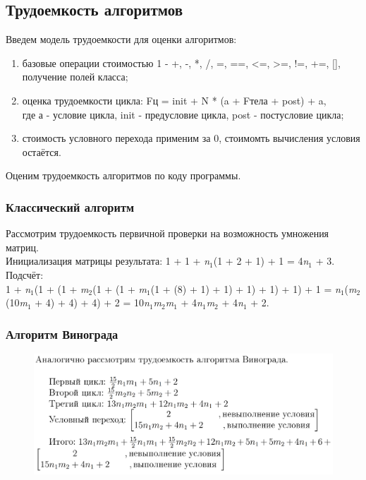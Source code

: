 \documentclass[a4paper, 12pt]{article}
\begin{document}
\begin{flushleft}
	\subsection{Трудоемкость алгоритмов}
	Введем модель трудоемкости для оценки алгоритмов:
	\begin{enumerate}
		\item базовые операции стоимостью 1 - +, -, *, /, =, ==, <=, >=, !=, +=, [], получение полей класса;
		\item оценка трудоемкости цикла: Fц = init + N * (a + Fтела + post) + a, \\где а - условие цикла, init - предусловие цикла, post - постусловие цикла;
		\item стоимость условного перехода применим за 0, стоимомть вычисления условия остаётся. 
	\end{enumerate}
	Оценим трудоемкость алгоритмов по коду программы.
	\subsubsection{Классический алгоритм}
	Рассмотрим трудоемкость первичной проверки на возможность умножения матриц.
	\\ \hspace*{5mm} Инициализация матрицы результата: 1 + 1 + {\it n}$_1$(1 + 2 + 1) + 1 = 4{\it n}$_1$ + 3.
	\\ \hspace*{5mm} Подсчёт:
	\\ 1 + {\it n}$_1$(1 + (1 + {\it m}$_2$(1 + (1 + {\it m}$_1$(1 + (8) + 1) + 1) + 1) + 1) + 1) + 1 =
	{\it n}$_1$({\it m}$_2$(10{\it m}$_1$ + 4) + 4) + 4) + 2 = 10{\it n}$_1${\it m}$_2${\it m}$_1$ + 4{\it n}$_1${\it m}$_2$ + 4{\it n}$_1$ + 2.
	
	\subsubsection{Алгоритм Винограда}
	\begin{figure}[h]
		\centering \includegraphics[scale=0.65]{223}
	\end{figure}
	\clearpage
	\newpage

\end{flushleft}
\end{document}
